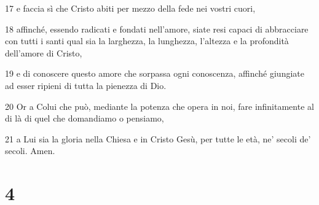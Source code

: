 \par 17 e faccia sì che Cristo abiti per mezzo della fede nei vostri cuori,
\par 18 affinché, essendo radicati e fondati nell'amore, siate resi capaci di abbracciare con tutti i santi qual sia la larghezza, la lunghezza, l'altezza e la profondità dell'amore di Cristo,
\par 19 e di conoscere questo amore che sorpassa ogni conoscenza, affinché giungiate ad esser ripieni di tutta la pienezza di Dio.
\par 20 Or a Colui che può, mediante la potenza che opera in noi, fare infinitamente al di là di quel che domandiamo o pensiamo,
\par 21 a Lui sia la gloria nella Chiesa e in Cristo Gesù, per tutte le età, ne' secoli de' secoli. Amen.

\chapter{4}

